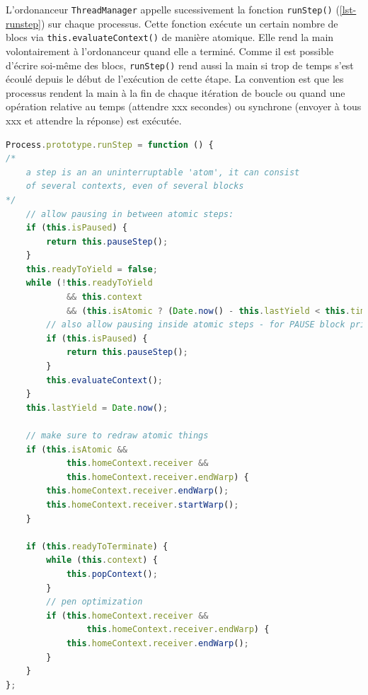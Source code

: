 L'ordonanceur \texttt{ThreadManager} appelle sucessivement la fonction \texttt{runStep()} (\ref{lst-runstep}) sur chaque processus. Cette fonction exécute un certain nombre de blocs via \texttt{this.evaluateContext()} de manière atomique. Elle rend la main volontairement à l'ordonanceur quand elle a terminé. Comme il est possible d'écrire soi-même des blocs, \texttt{runStep()} rend aussi la main si trop de temps s'est écoulé depuis le début de l'exécution de cette étape. La convention est que les processus rendent la main à la fin de chaque itération de boucle ou quand une opération relative au temps (attendre xxx secondes) ou synchrone (envoyer à tous xxx et attendre la réponse) est exécutée.

\begin{lstlisting}[caption={Fonction \texttt{runStep()} de \texttt{Process}},label=lst-runstep,language=JavaScript]
Process.prototype.runStep = function () {
/*
    a step is an an uninterruptable 'atom', it can consist
    of several contexts, even of several blocks
*/
    // allow pausing in between atomic steps:
    if (this.isPaused) {
        return this.pauseStep();
    }
    this.readyToYield = false;
    while (!this.readyToYield
            && this.context
            && (this.isAtomic ? (Date.now() - this.lastYield < this.timeout) : true) ) {
        // also allow pausing inside atomic steps - for PAUSE block primitive:
        if (this.isPaused) {
            return this.pauseStep();
        }
        this.evaluateContext();
    }
    this.lastYield = Date.now();

    // make sure to redraw atomic things
    if (this.isAtomic &&
            this.homeContext.receiver &&
            this.homeContext.receiver.endWarp) {
        this.homeContext.receiver.endWarp();
        this.homeContext.receiver.startWarp();
    }

    if (this.readyToTerminate) {
        while (this.context) {
            this.popContext();
        }
        // pen optimization
        if (this.homeContext.receiver &&
                this.homeContext.receiver.endWarp) {
            this.homeContext.receiver.endWarp();
        }
    }
};
\end{lstlisting}



